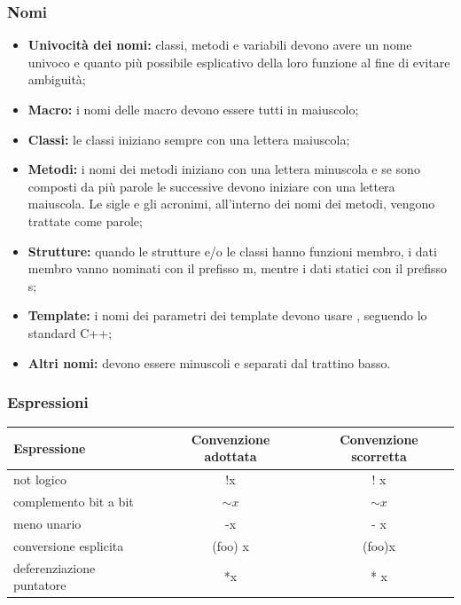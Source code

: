 \documentclass[../NomeDocumento.tex]{subfiles}
\begin{document}
	\subsubsection{Nomi}
	\begin{itemize}
		\item \textbf{Univocità dei nomi:} classi, metodi e variabili devono avere un nome univoco e quanto più possibile esplicativo della loro funzione al fine di evitare ambiguità;
		
		\item \textbf{Macro:} i nomi delle macro devono essere tutti in maiuscolo;
		
		\item \textbf{Classi:} le classi iniziano sempre con una lettera maiuscola;
		
		\item \textbf{Metodi:} i nomi dei metodi iniziano con una lettera minuscola e se sono composti da più parole le successive devono iniziare con una lettera maiuscola. Le sigle e gli acronimi, all'interno dei nomi dei metodi, vengono trattate come parole;
		
		\item \textbf{Strutture:} quando le strutture e/o le classi hanno funzioni membro, i dati membro vanno nominati con il prefisso m\textunderscore , mentre i dati statici con il prefisso s\textunderscore;
		
		\item \textbf{Template:} i nomi dei parametri dei template devono usare , seguendo lo standard C++;
		
		\item \textbf{Altri nomi:} devono essere minuscoli e separati dal trattino basso.
	\end{itemize}	
	
	\subsubsection{Espressioni}
	\begin{center}
	\begin{tabular}{|l|c|c|}
		\hline
		Espressione&Convenzione adottata&Convenzione scorretta \\ \hline
		not logico&!x&! x \\ \hline
		complemento bit a bit&${\sim}x$&$\sim x$ \\ \hline
		meno unario&-x&- x \\ \hline
		conversione esplicita&(foo) x&(foo)x \\ \hline
		deferenziazione puntatore&*x&* x \\ \hline
	\end{tabular}
	\end{center}
	
\end{document}
